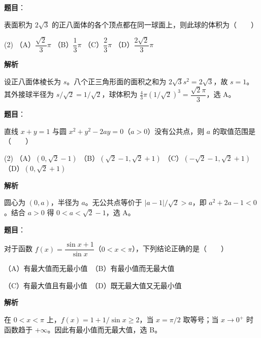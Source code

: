 \begin{answer}

\textbf{题目}：

表面积为 $2\sqrt3$ 的正八面体的各个顶点都在同一球面上，则此球的体积为\mbox{（　　）}

\begin{gkopts}(2)
\task （A）$\dfrac{\sqrt2}{3}\pi$
\task （B）$\dfrac13\pi$
\task （C）$\dfrac23\pi$
\task （D）$\dfrac{2\sqrt2}{3}\pi$
\end{gkopts}

\textbf{解析}

设正八面体棱长为 $s$。八个正三角形面的面积之和为 $2\sqrt3s^2=2\sqrt3$，故 $s=1$。其外接球半径为 $s/\sqrt2=1/\sqrt2$，球体积为 $\frac43\pi(1/\sqrt2)^3=\dfrac{\sqrt2\pi}{3}$，选 A。


\end{answer}
\begin{answer}

\textbf{题目}：

直线 $x+y=1$ 与圆 $x^2+y^2-2ay=0$（$a>0$）没有公共点，则 $a$ 的取值范围是\mbox{（　　）}

\begin{gkopts}(2)
\task （A）$(0,\sqrt2-1)$
\task （B）$(\sqrt2-1,\sqrt2+1)$
\task （C）$(-\sqrt2-1,\sqrt2+1)$
\task （D）$(0,\sqrt2+1)$
\end{gkopts}

\textbf{解析}

圆心为 $(0,a)$，半径为 $a$。无公共点等价于 $|a-1|/\sqrt2>a$，即 $a^2+2a-1<0$。结合 $a>0$ 得 $0<a<\sqrt2-1$，选 A。


\end{answer}
\begin{answer}

\textbf{题目}：

对于函数 $f(x)=\dfrac{\sin x+1}{\sin x}$（$0<x<\pi$），下列结论正确的是\mbox{（　　）}

（A）有最大值而无最小值　（B）有最小值而无最大值

（C）有最大值且有最小值　（D）既无最大值又无最小值

\textbf{解析}

在 $0<x<\pi$ 上，$f(x)=1+1/\sin x\ge2$，当 $x=\pi/2$ 取等号；当 $x\to0^+$ 时函数趋于 $+\infty$。因此有最小值而无最大值，选 B。


\end{answer}
